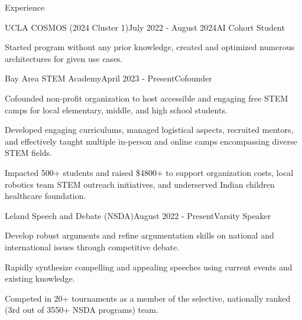 \documentclass[
  11pt, %
]{src/resume/resume} %
\begin{document}
\begin{rSection}{Experience}
\begin{rSubsection}{UCLA COSMOS (2024 Cluster 1)}{July 2022 - August 2024}{AI Cohort Student}{}
    \item Started program without any prior knowledge, created and optimized numerous architectures for given use cases.
    
  \end{rSubsection}
        
  \begin{rSubsection}{Bay Area STEM Academy}{April 2023 - Present}{Cofounder}{}
    
    \item Cofounded non-profit organization to host accessible and engaging free STEM camps for local elementary, middle, and high school students.
    
    \item Developed engaging curriculums, managed logistical aspects, recruited mentors, and effectively taught multiple in-person and online camps encompassing diverse STEM fields.
    
    \item Impacted 500+ students and raised \$4800+ to support organization costs, local robotics team STEM outreach initiatives, and underserved Indian children healthcare foundation.
    
  \end{rSubsection}
        
  \begin{rSubsection}{Leland Speech and Debate (NSDA)}{August 2022 - Present}{Varsity Speaker}{}
    
    \item Develop robust arguments and refine argumentation skills on national and international issues through competitive debate.
    
    \item Rapidly synthesize compelling and appealing speeches using current events and existing knowledge.
    
    \item Competed in 20+ tournaments as a member of the selective, nationally ranked (3rd out of 3550+ NSDA programs) team.
    
  \end{rSubsection}
        
	
\end{rSection}

\end{document}
